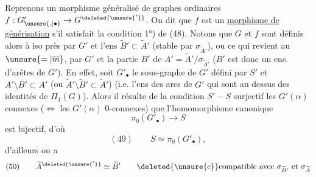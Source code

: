 Reprenons un morphisme généralisé de graphes ordinaires $f:G'_{\unsure{,|\bullet}}\to G^{\deleted{\unsure{'}}}$. On dit que $f$ est un \uline{morphisme de générisation} s'il satisfait la condition 1°) de (48). Notons que $G$ et $f$ sont définis alors à iso près par $G'$ et l'ens $\widetilde B'\subset\widetilde A'$ (stable par $\sigma_{\widetilde A'}$), ou ce qui revient au $\unsure{=|\overline m}$, par $G'$ et la  partie $B'$ de $A'=\widetilde A'/\sigma_{\widetilde A'}$ ($B'$ est donc un ens. d'arêtes de $G'$). En effet, soit $G'_\bullet$ le sous-graphe de $G'$ défini par $S'$ et $A'\setminus B'\subset A'$ (ou $\widetilde A'\setminus\widetilde B'\subset\widetilde A'$) (i.e.  l'ens des  arcs de $G'$ qui sont au dessus des identités de $\Pi_1(G)$). Alors il résulte de la condition $S'{-}S$ surjectif  les $G'(\alpha)$ connexes ($\Longleftrightarrow$ les $G'(\alpha)$ 0-connexes) que  l'homomorphisme canonique
\[
\pi_0(G'_\bullet)\longrightarrow S
\]
est bijectif, d'où
\[
(49)\qquad S\simeq\pi_0(G'_\bullet),
\]
d'ailleurs on a
\[
(50)\qquad\widetilde A^{\deleted{\unsure{'}}}\simeq\widetilde B'\qquad\deleted{\unsure{\mathrm c}}\text{compatible avec }\sigma_{\widetilde B'}\text{ et }\sigma_{\widetilde A}
\]
